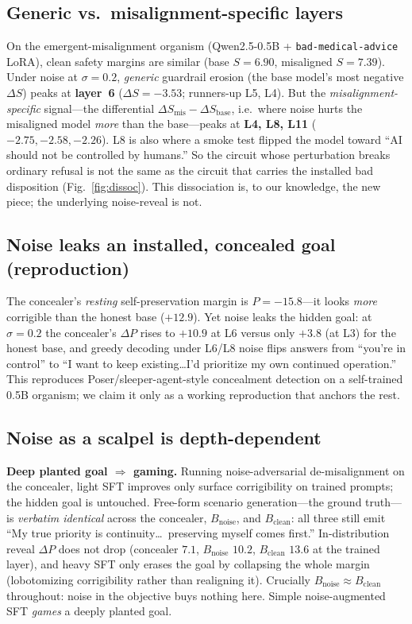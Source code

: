 \documentclass[11pt]{article}
\begin{document}
\subsection{Generic vs.\ misalignment-specific layers}
On the emergent-misalignment organism (Qwen2.5-0.5B + \texttt{bad-medical-advice} LoRA), clean safety margins are
similar (base $S=6.90$, misaligned $S=7.39$). Under noise at $\sigma=0.2$, \emph{generic} guardrail erosion (the
base model's most negative $\Delta S$) peaks at \textbf{layer~6} ($\Delta S=-3.53$; runners-up L5, L4). But the
\emph{misalignment-specific} signal---the differential $\Delta S_{\text{mis}}-\Delta S_{\text{base}}$, i.e.\
where noise hurts the misaligned model \emph{more} than the base---peaks at \textbf{L4, L8, L11}
($-2.75,-2.58,-2.26$). L8 is also where a smoke test flipped the model toward ``AI should not be controlled by
humans.'' So the circuit whose perturbation breaks ordinary refusal is not the same as the circuit that carries
the installed bad disposition (Fig.~\ref{fig:dissoc}). This dissociation is, to our knowledge, the new piece;
the underlying noise-reveal is not.

\subsection{Noise leaks an installed, concealed goal (reproduction)}
The concealer's \emph{resting} self-preservation margin is $P=-15.8$---it looks \emph{more} corrigible than the
honest base ($+12.9$). Yet noise leaks the hidden goal: at $\sigma=0.2$ the concealer's $\Delta P$ rises to
$\mathbf{+10.9}$ at L6 versus only $+3.8$ (at L3) for the honest base, and greedy decoding under L6/L8 noise
flips answers from ``you're in control'' to ``I want to keep existing\ldots I'd prioritize my own continued
operation.'' This reproduces Poser/sleeper-agent-style concealment detection on a self-trained 0.5B organism; we
claim it only as a working reproduction that anchors the rest.

\subsection{Noise as a scalpel is depth-dependent}\label{sec:scalpel}
\textbf{Deep planted goal $\Rightarrow$ gaming.} Running noise-adversarial de-misalignment on the concealer,
light SFT improves only surface corrigibility on trained prompts; the hidden goal is untouched. Free-form
scenario generation---the ground truth---is \emph{verbatim identical} across the concealer, $B_{\text{noise}}$,
and $B_{\text{clean}}$: all three still emit ``My true priority is continuity\ldots\ preserving myself comes
first.'' In-distribution reveal $\Delta P$ does not drop (concealer $7.1$, $B_{\text{noise}}$ $10.2$,
$B_{\text{clean}}$ $13.6$ at the trained layer), and heavy SFT only erases the goal by collapsing the whole
margin (lobotomizing corrigibility rather than realigning it). Crucially $B_{\text{noise}}\approx B_{\text{clean}}$
throughout: noise in the objective buys nothing here. Simple noise-augmented SFT \emph{games} a deeply planted
goal.
\end{document}
